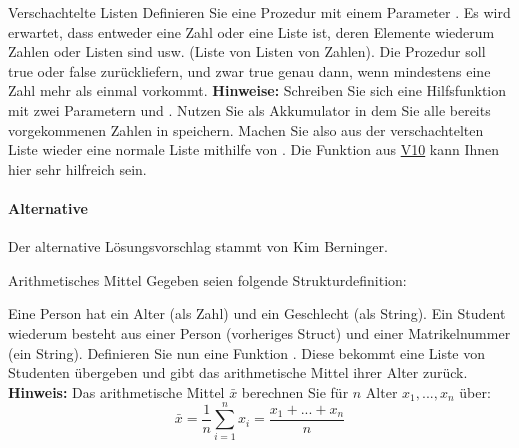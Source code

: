 \documentclass{../preamble}
\begin{document}
	\begin{task}[credit = \stars{3}{3}]{Verschachtelte Listen}
	    Definieren Sie eine Prozedur  mit einem Parameter .  Es wird erwartet, dass  entweder eine Zahl oder eine Liste ist, deren  Elemente wiederum Zahlen oder Listen sind usw. (Liste von Listen von Zahlen). Die Prozedur  soll \textcolor{keywordcolor}{true} oder \textcolor{keywordcolor}{false} zurückliefern, und zwar \textcolor{keywordcolor}{true} genau dann, wenn mindestens eine Zahl mehr als einmal vorkommt.
	    \br
	    \textbf{Hinweise:} Schreiben Sie sich eine Hilfsfunktion  mit zwei Parametern  und . Nutzen Sie  als Akkumulator in dem Sie alle bereits vorgekommenen Zahlen in  speichern. Machen Sie also aus der verschachtelten Liste wieder eine normale Liste mithilfe von . Die Funktion aus  \hyperref[task:V10]{V10} kann Ihnen hier sehr hilfreich sein.
	
	    \begin{solution}
	        
	        
	        \clearpage
	        
	        \paragraph{Alternative}
	        
	        Der alternative Lösungsvorschlag stammt von Kim Berninger.
	        
	    \end{solution}
	\end{task}
	
	\clearpage
	
	\begin{task}[credit = \stars{3}{3}]{Arithmetisches Mittel}
	    Gegeben seien folgende Strukturdefinition:
	    
	    Eine Person hat ein Alter (als Zahl) und ein Geschlecht (als String). Ein Student wiederum besteht aus einer Person (vorheriges Struct) und einer Matrikelnummer (ein String).
	    \br
	    Definieren Sie nun eine Funktion . Diese bekommt eine Liste von Studenten übergeben und gibt das arithmetische Mittel ihrer Alter zurück.
	    \br
	    \textbf{Hinweis:} Das arithmetische Mittel \(\bar{x}\) berechnen Sie für \(n\) Alter \(x_1, ..., x_n\) über:
	    \begin{equation*}
	        \bar{x} = \frac{1}{n} \sum_{i = 1}^n x_i = \frac{x_1 + ... + x_n}{n}
	    \end{equation*}
	
		\clearpage
		
	    \begin{solution}
	        
	    \end{solution}
	\end{task}
\end{document}
